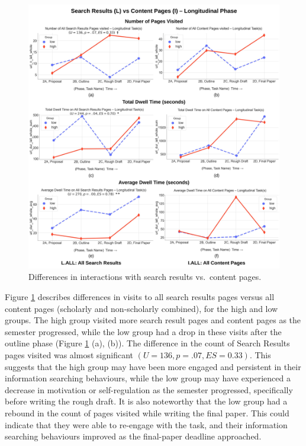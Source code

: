 \documentclass[letterpaper, nobind]{templates/ociamthesis}
\begin{document}
\begin{figure}

{\centering \includegraphics[width=1\linewidth]{figs/rp2-lvi} 

}

\caption[Differences in interactions with search results vs.~content pages - longitudinal phase.]{Differences in interactions with search results vs.~content pages.}\label{fig:rp2-lvi}
\end{figure}





Figure \ref{fig:rp2-lvi} describes differences in visits to all search results pages versus all content pages (scholarly and non-scholarly combined), for the high and low groups.
The high group visited more search result pages and content pages as the semester progressed, while the low group had a drop in these visits after the outline phase (Figure \ref{fig:rp2-lvi} (a), (b)).
The difference in the count of Search Results pages visited was almost significant \((U = 136, p = .07, ES = 0.33)\).
This suggests that the high group may have been more engaged and persistent in their information searching behaviours, while the low group may have experienced a decrease in motivation or self-regulation as the semester progressed, specifically before writing the rough draft.
It is also noteworthy that the low group had a rebound in the count of pages visited while writing the final paper. This could indicate that they were able to re-engage with the task, and their information searching behaviours improved as the final-paper deadline approached.
\end{document}
